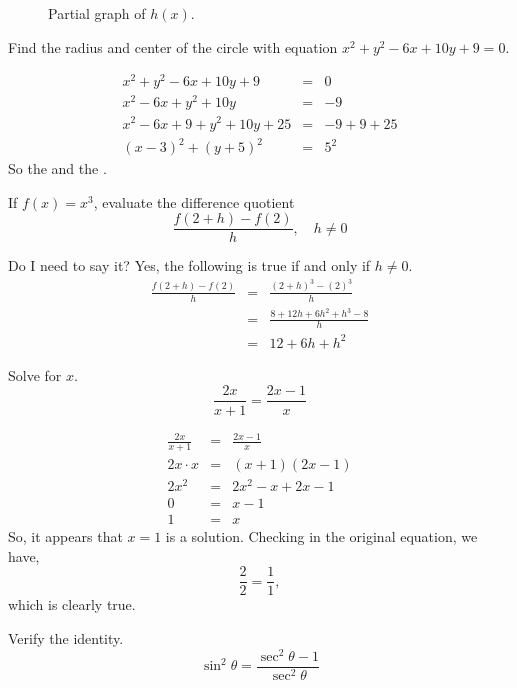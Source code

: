 \documentclass[12pt,addpoints, answers, fleqn]{exam}
\begin{document}
\begin{questions}
\begin{figure}[hbtp]
\caption{Partial graph of $h \left( x \right)$.}
\label{fig:graph10}
\end{figure}
\question Find the radius and center of the circle with equation $x^2+y^2-6x+10y+9=0$.
\begin{solution}
\begin{eqnarray*}
x^2+y^2-6x+10y+9&=&0\\
x^2-6x+y^2+10y&=&-9\\
x^2-6x+9+y^2+10y+25&=&-9+9+25\\
\left( x-3\right)^2 + \left( y+5\right)^2&=&5^2
\end{eqnarray*}
So the  and the .
\end{solution}
\question If $f \left( x \right) = x^3$, evaluate the difference quotient
\[
\frac{f \left( 2+h \right) - f \left( 2 \right)}{h}, \quad h \neq 0
\]
\begin{solution} Do I need to say it? Yes, the following is true if and only if $h \neq 0$.
\begin{eqnarray*}
\frac{f \left( 2+h \right) - f \left( 2 \right)}{h} &=& \frac{\left( 2+h \right)^3 - \left( 2 \right)^3}{h}\\
 &=& \frac{ 8+12h+6h^2+h^3- 8}{h}\\
  &=& \boxed{12+6h+h^2}
\end{eqnarray*}
\end{solution}
\question Solve for $x$.
\[
\frac{2x}{x+1} = \frac{2x-1}{x}
\]
\begin{solution}
\begin{eqnarray*}
\frac{2x}{x+1} &=& \frac{2x-1}{x}\\
2x \cdot x &=& \left( x+1\right) \left( 2x-1\right) \\
2x^2 &=& 2x^2 -x + 2x -1 \\
0&=& x -1 \\
1&=& x
\end{eqnarray*}
So, it appears that $\boxed{x=1}$ is a solution. Checking in the original equation, we have,
\[
\frac{2}{2} = \frac{1}{1},
\]
which is clearly true. 
\end{solution}
\question Verify the identity.
\[
\sin^2 \theta = \frac{\sec^2 \theta - 1}{\sec^2 \theta}
\]
\begin{solution}

\end{solution}
\end{questions}
\end{document}
